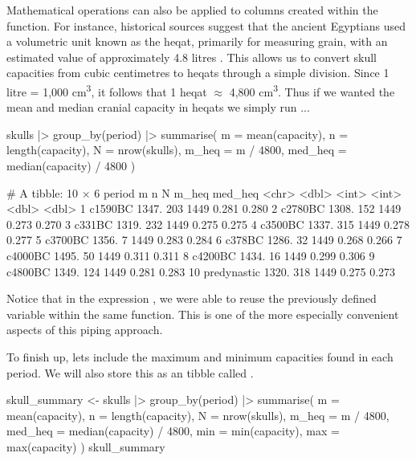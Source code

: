 Mathematical operations can also be applied to columns created within the  function. For instance, historical sources suggest that the ancient Egyptians used a volumetric unit known as the heqat, primarily for measuring grain, with an estimated value of approximately 4.8 litres \parencite{Clagett1989}. This allows us to convert skull capacities from cubic centimetres to heqats through a simple division. Since 1 litre = 1,000 cm\textsuperscript{3}, it follows that 1 heqat $\approx$ 4,800 cm\textsuperscript{3}. Thus if we wanted the mean and median cranial capacity in heqats we simply run ...

\begin{inR}
skulls |>
  group_by(period) |>
  summarise(
    m = mean(capacity),
    n = length(capacity),
    N = nrow(skulls),
    m_heq = m / 4800,
    med_heq = median(capacity) / 4800
  )
\end{inR}

\begin{outR}
# A tibble: 10 × 6
   period          m     n     N m_heq med_heq
   <chr>       <dbl> <int> <int> <dbl>   <dbl>
 1 c1590BC     1347.   203  1449 0.281   0.280
 2 c2780BC     1308.   152  1449 0.273   0.270
 3 c331BC      1319.   232  1449 0.275   0.275
 4 c3500BC     1337.   315  1449 0.278   0.277
 5 c3700BC     1356.     7  1449 0.283   0.284
 6 c378BC      1286.    32  1449 0.268   0.266
 7 c4000BC     1495.    50  1449 0.311   0.311
 8 c4200BC     1434.    16  1449 0.299   0.306
 9 c4800BC     1349.   124  1449 0.281   0.283
10 predynastic 1320.   318  1449 0.275   0.273
\end{outR}

\noindent
Notice that in the expression , we were able to reuse the previously defined variable  within the same  function. This is one of the more especially convenient aspects of this piping approach.

To finish up, lets include the maximum and minimum capacities found in each period. We will also store this as an tibble called .

\begin{inR}
skull_summary <- skulls |>
  group_by(period) |>
  summarise(
    m = mean(capacity),
    n = length(capacity),
    N = nrow(skulls),
    m_heq = m / 4800,
    med_heq = median(capacity) / 4800,
    min = min(capacity),
    max = max(capacity)
  )
skull_summary
\end{inR}

